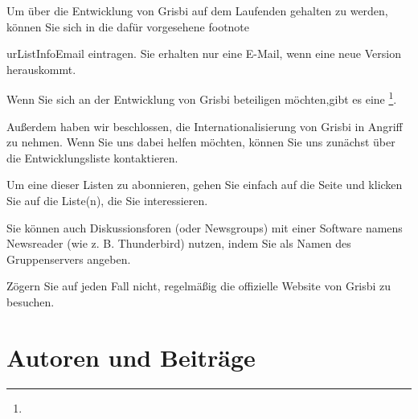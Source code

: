 Um über die Entwicklung von Grisbi auf dem Laufenden gehalten zu werden, können Sie sich in die dafür vorgesehene footnote{urListInfoEmail{} eintragen. Sie erhalten nur eine E-Mail, wenn eine neue Version herauskommt.

Wenn Sie sich an der Entwicklung von Grisbi beteiligen möchten,gibt es eine \footnote{\urlListDevelEmail{}}.

Außerdem haben wir beschlossen, die Internationalisierung von Grisbi in Angriff zu nehmen. Wenn Sie uns dabei helfen möchten, können Sie uns zunächst über die Entwicklungsliste kontaktieren.

Um eine dieser Listen zu abonnieren, gehen Sie einfach auf die Seite \urlListDiffGrisbi{} und klicken Sie auf die Liste(n), die Sie interessieren.


Sie können auch Diskussionsforen (oder Newsgroups) mit einer Software namens \glqq{}Newsreader\grqq{} (wie z. B. Thunderbird) nutzen, indem Sie  als Namen des Gruppenservers angeben.

Zögern Sie auf jeden Fall nicht, regelmäßig die offizielle Website von Grisbi zu besuchen.



\section{Autoren und Beiträge\label{introduction-authors}}		%


}
